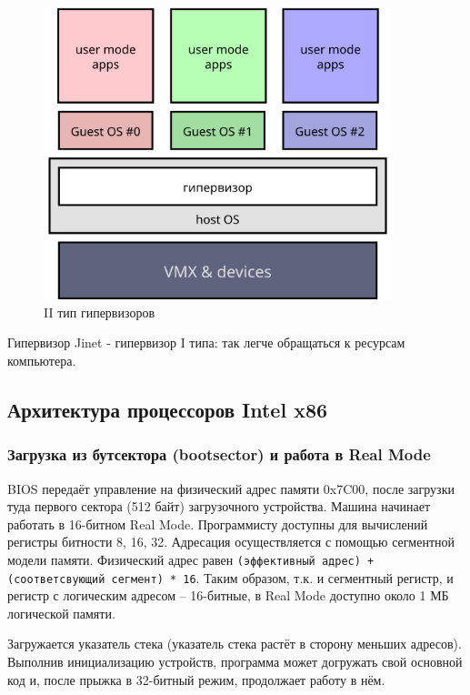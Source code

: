 \documentclass[a4paper,12pt]{extarticle}
\begin{document}
\begin{itemize}
\begin{figure}[htb]
\begin{minipage}{0.45\textwidth}
				\includegraphics[width=0.9\textwidth]{../diagrams/hyper_type2}
				\caption{II тип гипервизоров}
				\label{fig:hypertype2}
			\end{minipage}
		\end{figure}
		Гипервизор Jinet - гипервизор I типа: так легче обращаться к ресурсам компьютера.
	\end{itemize}
	\subsection{Архитектура процессоров Intel x86}
	\subsubsection{Загрузка из бутсектора (bootsector) и работа в Real Mode}
		BIOS передаёт управление на физический адрес памяти 0x7C00, после загрузки туда первого сектора (512 байт) загрузочного устройства. Машина начинает работать в 16-битном Real Mode. Программисту доступны для вычислений регистры битности 8, 16, 32. Адресация осуществляется с помощью сегментной модели памяти. Физический адрес равен \texttt{(эффективный адрес) + (соответсвующий сегмент) * 16}. Таким образом, т.к. и сегментный регистр, и регистр с логическим адресом -- 16-битные, в Real Mode доступно около 1 МБ логической памяти.\par
		Загружается указатель стека (указатель стека растёт в сторону меньших адресов). Выполнив инициализацию устройств, программа может догружать свой основной код и, после прыжка в 32-битный режим, продолжает работу в нём. \par
\end{document}
